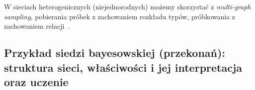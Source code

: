 \documentclass[wi]{zut}
\begin{document}
W sieciach heterogenicznych (niejednorodnych) możemy skorzystać z \emph{multi-graph sampling}, pobierania próbek z zachowaniem rozkładu typów, próbkowania z zachowaniem relacji~\cite{Jankowski2020_probkowanie}.








\subsection{Przykład siedzi bayesowskiej (przekonań): struktura sieci, właściwości i jej interpretacja oraz uczenie}
\end{document}
